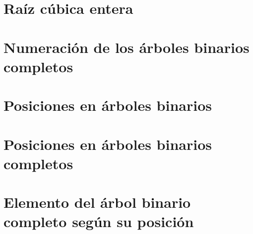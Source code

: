 \documentclass[a4paper,12pt,twoside]{book}
\begin{document}
\chapter{Raíz cúbica entera}

\chapter{Numeración de los árboles binarios completos}

\chapter{Posiciones en árboles binarios}

\chapter{Posiciones en árboles binarios completos}

\chapter{Elemento del árbol binario completo según su
  posición}


\end{document}
